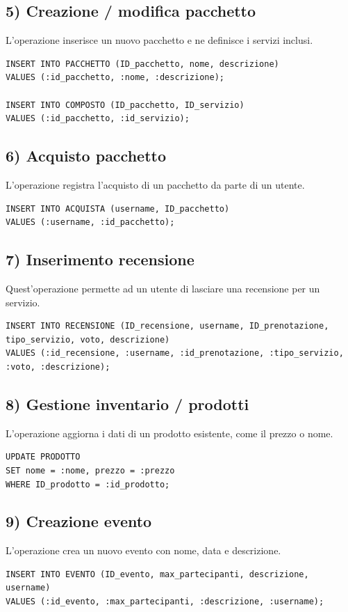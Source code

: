 \documentclass[a4paper,12pt]{report}
\begin{document}
\subsection*{5) Creazione / modifica pacchetto}
L'operazione inserisce un nuovo pacchetto e ne definisce i servizi inclusi.
\begin{verbatim}
INSERT INTO PACCHETTO (ID_pacchetto, nome, descrizione)
VALUES (:id_pacchetto, :nome, :descrizione);

INSERT INTO COMPOSTO (ID_pacchetto, ID_servizio)
VALUES (:id_pacchetto, :id_servizio);
\end{verbatim}

\subsection*{6) Acquisto pacchetto}
L'operazione registra l’acquisto di un pacchetto da parte di un utente.
\begin{verbatim}
INSERT INTO ACQUISTA (username, ID_pacchetto)
VALUES (:username, :id_pacchetto);
\end{verbatim}

\subsection*{7) Inserimento recensione}
Quest'operazione permette ad un utente di lasciare una recensione per un servizio.
\begin{verbatim}
INSERT INTO RECENSIONE (ID_recensione, username, ID_prenotazione, 
tipo_servizio, voto, descrizione)
VALUES (:id_recensione, :username, :id_prenotazione, :tipo_servizio, 
:voto, :descrizione);
\end{verbatim}

\subsection*{8) Gestione inventario / prodotti}
L'operazione aggiorna i dati di un prodotto esistente, come il prezzo o nome.
\begin{verbatim}
UPDATE PRODOTTO
SET nome = :nome, prezzo = :prezzo
WHERE ID_prodotto = :id_prodotto;
\end{verbatim}

\subsection*{9) Creazione evento}
L'operazione crea un nuovo evento con nome, data e descrizione.
\begin{verbatim}
INSERT INTO EVENTO (ID_evento, max_partecipanti, descrizione, username)
VALUES (:id_evento, :max_partecipanti, :descrizione, :username);
\end{verbatim}
\end{document}
